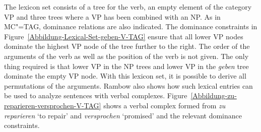 \addlines
The lexicon set consists of a tree for the verb, an empty element of the category VP and three trees where a VP has been combined with
an NP. As in MC"=TAG, dominance relations are also indicated. The dominance constraints in Figure~\ref{Abbildung-Lexical-Set-geben-V-TAG}
ensure that all lower VP nodes dominate the highest VP node of the tree further to the right. The order of the arguments of the verb as
well as the position of the verb is not given. The only thing required is that lower VP in the NP
trees and lower VP in the \emph{geben} tree dominate the empty VP node.
With this lexicon set, it is possible to derive all permutations of the arguments. Rambow also shows
how such lexical entries can be used to analyze sentences with verbal complexes. Figure~\vref{Abbildung-zu-reparieren-versprochen-V-TAG} shows a verbal complex formed from
\emph{zu reparieren} `to repair' and \emph{versprochen} `promised' and the relevant dominance constraints.
